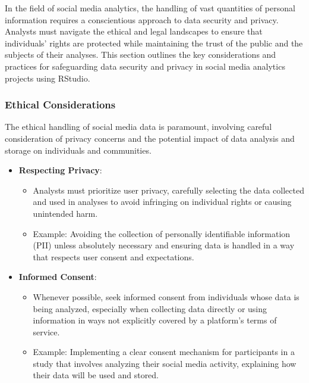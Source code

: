 \documentclass[
]{book}
\providecommand{\tightlist}{%
  \setlength{\itemsep}{0pt}\setlength{\parskip}{0pt}}
\begin{document}
In the field of social media analytics, the handling of vast quantities of personal information requires a conscientious approach to data security and privacy. Analysts must navigate the ethical and legal landscapes to ensure that individuals' rights are protected while maintaining the trust of the public and the subjects of their analyses. This section outlines the key considerations and practices for safeguarding data security and privacy in social media analytics projects using RStudio.

\hypertarget{ethical-considerations}{%
\subsubsection{Ethical Considerations}\label{ethical-considerations}}

The ethical handling of social media data is paramount, involving careful consideration of privacy concerns and the potential impact of data analysis and storage on individuals and communities.

\begin{itemize}
\tightlist
\item
  \textbf{Respecting Privacy}:

  \begin{itemize}
  \tightlist
  \item
    Analysts must prioritize user privacy, carefully selecting the data collected and used in analyses to avoid infringing on individual rights or causing unintended harm.
  \item
    Example: Avoiding the collection of personally identifiable information (PII) unless absolutely necessary and ensuring data is handled in a way that respects user consent and expectations.
  \end{itemize}
\item
  \textbf{Informed Consent}:

  \begin{itemize}
  \tightlist
  \item
    Whenever possible, seek informed consent from individuals whose data is being analyzed, especially when collecting data directly or using information in ways not explicitly covered by a platform's terms of service.
  \item
    Example: Implementing a clear consent mechanism for participants in a study that involves analyzing their social media activity, explaining how their data will be used and stored.
  \end{itemize}
\end{itemize}
\end{document}
